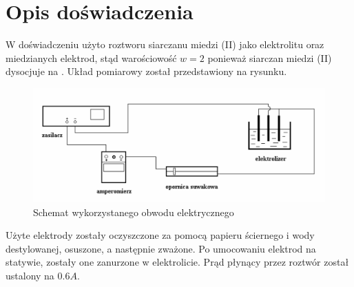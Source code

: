 \documentclass[a4paper,10pt,twoside]{article}
\begin{document}
\section{Opis doświadczenia}
W doświadczeniu użyto roztworu siarczanu miedzi (II)  jako elektrolitu oraz miedzianych elektrod, stąd warościowość $w=2$ ponieważ siarczan miedzi (II)
dysocjuje na . Układ pomiarowy został przedstawiony na rysunku.
\begin{figure}[!htb]
\centerline{\includegraphics[scale=0.3]{scheme}}
\caption{Schemat wykorzystanego obwodu elektrycznego}
\end{figure}
Użyte elektrody zostały oczyszczone za pomocą papieru ściernego i wody destylowanej, osuszone, a następnie zważone. Po umocowaniu elektrod na statywie, zostały one
zanurzone w elektrolicie. Prąd płynący przez roztwór został ustalony na $0.6A$.
\end{document}
